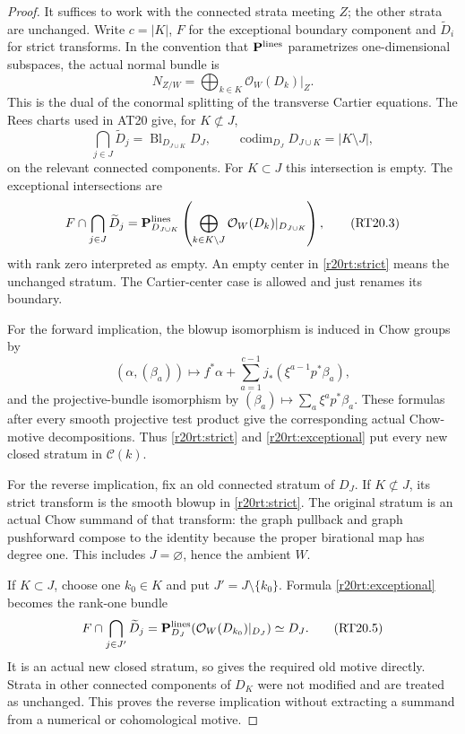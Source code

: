 \begin{proof}
It suffices to work with the connected strata meeting $Z$;
the other strata are unchanged.  Write $c=|K|$, $F$ for
the exceptional boundary component and $\widetilde D_i$ for
strict transforms.  In the convention that $\mathbf P^{\rm lines}$
parametrizes one-dimensional subspaces, the actual normal bundle is
\[
 N_{Z/W}=\bigoplus_{k\in K}\mathcal O_W(D_k)|_Z.
 \tag{RT20.1}\label{r20rt:normal}
\]
This is the dual of the conormal splitting of the transverse
Cartier equations.  The Rees charts used in AT20 give, for
$K\not\subset J$,
\[
 \bigcap_{j\in J}\widetilde D_j
   =\operatorname{Bl}_{D_{J\cup K}}D_J,
 \qquad
 \operatorname{codim}_{D_J}D_{J\cup K}=|K\setminus J|,
 \tag{RT20.2}\label{r20rt:strict}
\]
on the relevant connected components.  For $K\subset J$
this intersection is empty.  The exceptional intersections are
\[
 F\cap\bigcap_{j\in J}\widetilde D_j
  =\mathbf P^{\rm lines}_{D_{J\cup K}}
       \left(\bigoplus_{k\in K\setminus J}
                     \mathcal O_W(D_k)|_{D_{J\cup K}}\right),
 \tag{RT20.3}\label{r20rt:exceptional}
\]
with rank zero interpreted as empty.  An empty center in
\eqref{r20rt:strict} means the unchanged stratum.  The
Cartier-center case is allowed and just renames its boundary.

For the forward implication, the blowup isomorphism is
induced in Chow groups by
\[
 (\alpha,(\beta_a))\longmapsto
 f^*\alpha+\sum_{a=1}^{c-1}j_*(\xi^{a-1}p^*\beta_a),
 \tag{RT20.4}\label{r20rt:chowmap}
\]
and the projective-bundle isomorphism by
$ (\beta_a)\mapsto\sum_a\xi^a p^*\beta_a$.
These formulas after every smooth projective test product
give the corresponding actual Chow-motive decompositions.
Thus \eqref{r20rt:strict} and \eqref{r20rt:exceptional}
put every new closed stratum in $\mathcal C(k)$.

For the reverse implication, fix an old connected stratum
of $D_J$.  If $K\not\subset J$, its strict transform is
the smooth blowup in \eqref{r20rt:strict}.  The original
stratum is an actual Chow summand of that transform: the
graph pullback and graph pushforward compose to the
identity because the proper birational map has degree one.
This includes $J=\varnothing$, hence the ambient $W$.

If $K\subset J$, choose one $k_0\in K$ and put
$J'=J\setminus\{k_0\}$.  Formula
\eqref{r20rt:exceptional} becomes the rank-one bundle
\[
 F\cap\bigcap_{j\in J'}\widetilde D_j
     =\mathbf P^{\rm lines}_{D_J}
                    (\mathcal O_W(D_{k_0})|_{D_J})
     \simeq D_J.
 \tag{RT20.5}\label{r20rt:recovery}
\]
It is an actual new closed stratum, so gives the required
old motive directly.  Strata in other connected components
of $D_K$ were not modified and are treated as unchanged.
This proves the reverse implication without extracting a
summand from a numerical or cohomological motive.
\end{proof}

